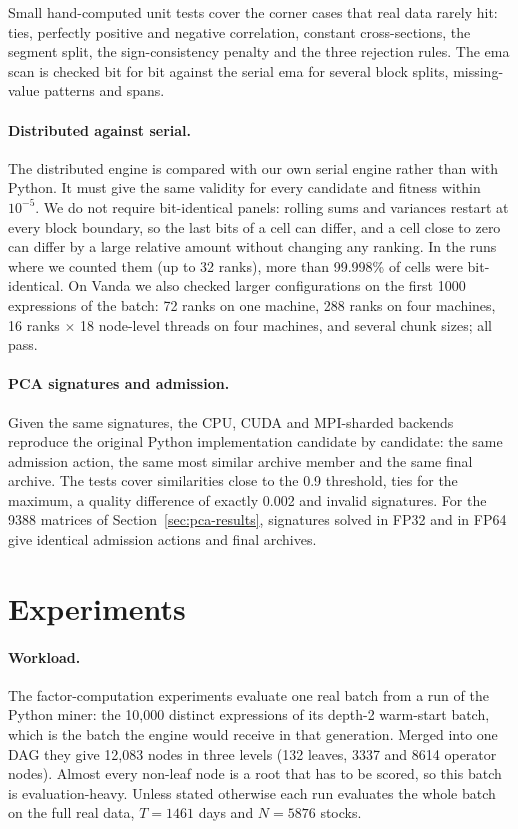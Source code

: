 \documentclass[11pt,a4paper]{article}
\begin{document}
Small hand-computed unit tests cover the corner cases that real data rarely hit: ties, perfectly positive and negative correlation, constant cross-sections, the segment split, the sign-consistency penalty and the three rejection rules. The ema scan is checked bit for bit against the serial ema for several block splits, missing-value patterns and spans.

\paragraph{Distributed against serial.} The distributed engine is compared with our own serial engine rather than with Python. It must give the same validity for every candidate and fitness within $10^{-5}$. We do not require bit-identical panels: rolling sums and variances restart at every block boundary, so the last bits of a cell can differ, and a cell close to zero can differ by a large relative amount without changing any ranking. In the runs where we counted them (up to 32 ranks), more than 99.998\% of cells were bit-identical. On Vanda we also checked larger configurations on the first 1000 expressions of the batch: 72 ranks on one machine, 288 ranks on four machines, 16 ranks $\times$ 18 node-level threads on four machines, and several chunk sizes; all pass.

\paragraph{PCA signatures and admission.} Given the same signatures, the CPU, CUDA and MPI-sharded backends reproduce the original Python implementation candidate by candidate: the same admission action, the same most similar archive member and the same final archive. The tests cover similarities close to the 0.9 threshold, ties for the maximum, a quality difference of exactly 0.002 and invalid signatures. For the 9388 matrices of Section~\ref{sec:pca-results}, signatures solved in FP32 and in FP64 give identical admission actions and final archives.

\section{Experiments}
\label{sec:experiments}
\paragraph{Workload.} The factor-computation experiments evaluate one real batch from a run of the Python miner: the 10{,}000 distinct expressions of its depth-2 warm-start batch, which is the batch the engine would receive in that generation. Merged into one DAG they give 12{,}083 nodes in three levels (132 leaves, 3337 and 8614 operator nodes). Almost every non-leaf node is a root that has to be scored, so this batch is evaluation-heavy. Unless stated otherwise each run evaluates the whole batch on the full real data, $T=1461$ days and $N=5876$ stocks.
\end{document}
